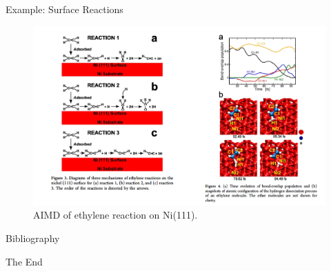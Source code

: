 \documentclass[aspectratio=169]{beamer}
\begin{document}
\begin{frame}{Example: Surface Reactions}
\begin{figure}
    \centering
    \includegraphics[width=0.6\linewidth]{lectures/figures/13-Surface_reactions.png}
    \caption{AIMD of ethylene reaction on Ni(111).\cite{arifinInitioMolecularDynamics2015}}
\end{figure} 
\end{frame} 


    \begin{frame}[allowframebreaks]{Bibliography}
        
        
    \end{frame}



    \begin{frame}
        \Huge{\centerline{The End}}
    \end{frame}
\end{document}
